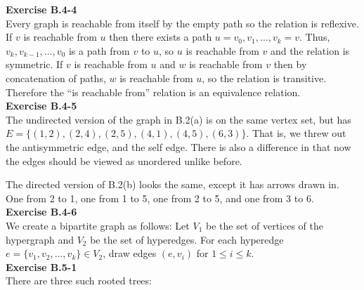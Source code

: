 \documentclass{article}
\begin{document}
\noindent\textbf{Exercise B.4-4}\\

Every graph is reachable from itself by the empty path so the relation is reflexive.  If $v$ is reachable from $u$ then there exists a path $u = v_0, v_1, \ldots, v_k = v$.  Thus, $v_k, v_{k-1}, \ldots, v_0$ is a path from $v$ to $u$, so $u$ is reachable from $v$ and the relation is symmetric.  If $v$ is reachable from $u$ and $w$ is reachable from $v$ then by concatenation of paths, $w$ is reachable from $u$, so the relation is transitive.  Therefore the ``is reachable from'' relation is an equivalence relation. \\


\noindent\textbf{Exercise B.4-5}\\
The undirected version of the graph in B.2(a) is on the same vertex set, but has $E =\{(1,2),(2,4),(2,5),(4,1),(4,5),(6,3)\}$. That is, we threw out the antisymmetric edge, and the self edge. There is also a difference in that now the edges should be viewed as unordered unlike before.

The directed version of B.2(b) looks the same, except it has arrows drawn in. One from 2 to 1, one from 1 to 5, one from 2 to 5, and one from 3 to 6.\\

\noindent\textbf{Exercise B.4-6}\\

We create a bipartite graph as follows:  Let $V_1$ be the set of vertices of the hypergraph and $V_2$ be the set of hyperedges.  For each hyperedge $e = \{v_1, v_2, \ldots, v_k\} \in V_2$, draw edges $(e,v_i)$ for $1 \leq i \leq k$.  \\


\noindent\textbf{Exercise B.5-1}\\
There are three such rooted trees:

\end{document}
